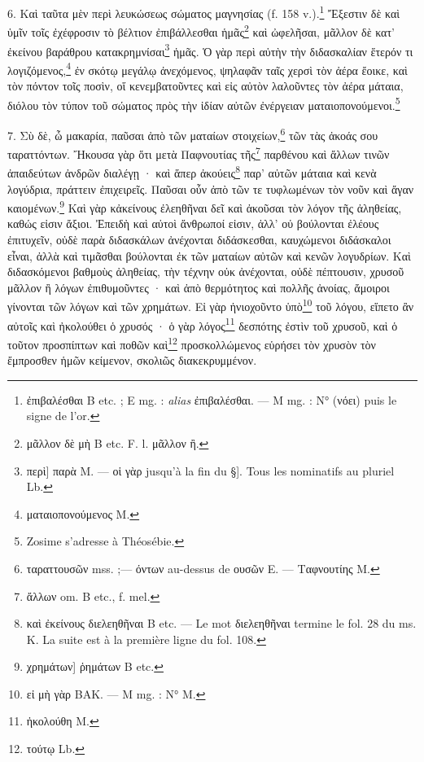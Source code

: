 \documentclass[landscape, a4paper, 11pt, oneside, polutonikogreek, french]{article}
\begin{document}
6. Καὶ ταῦτα μὲν περὶ λευκώσεως σώματος μαγνησίας (f. 158 v.).\footnote{ἐπιβαλέσθαι B etc. ; E mg. : \emph{alias} ἐπιβαλέσθαι. --- M mg. : N° (νόει) puis le signe de l'or.} Ἔξεστιν δὲ καὶ ὑμῖν τοῖς ἐχέφροσιν τὸ βέλτιον ἐπιβάλλεσθαι ἡμᾶς\footnote{μᾶλλον δὲ μὴ B etc. F. l. μᾶλλον ἢ.} καὶ ὠφελῆσαι, μᾶλλον δὲ κατ' ἐκείνου βαράθρου κατακρημνίσαι\footnote{περὶ] παρὰ M. --- οἱ γὰρ jusqu'à la fin du §]. Tous les nominatifs au pluriel Lb.} ἡμᾶς. Ὁ γὰρ περὶ αὐτὴν τὴν διδασκαλίαν ἕτερόν τι λογιζόμενος,\footnote{ματαιοπονούμενος M.} ἐν σκότῳ μεγάλῳ ἀνεχόμενος, ψηλαφᾶν ταῖς χερσὶ τὸν ἀέρα ἔοικε, καὶ τὸν πόντον τοῖς ποσὶν, οἵ κενεμβατοῦντες καὶ εἰς αὐτὸν λαλοῦντες τὸν ἀέρα μάταια, διόλου τὸν τύπον τοῦ σώματος πρὸς τὴν ἰδίαν αὐτῶν ἐνέργειαν ματαιοπονούμενοι.\footnote{Zosime s'adresse à Théosébie.}

7. Σὺ δὲ, ὦ μακαρία, παῦσαι ἀπὸ τῶν ματαίων στοιχείων,\footnote{ταραττουσῶν mss. ;--- όντων au-dessus de ουσῶν E. --- Ταφνουτίης M.} τῶν τὰς ἀκοάς σου ταραττόντων. Ἤκουσα γὰρ ὅτι μετὰ Παφνουτίας τῆς\footnote{ἄλλων om. B etc., f. mel.} παρθένου καὶ ἄλλων τινῶν ἀπαιδεύτων ἀνδρῶν διαλέγῃ · καὶ ἅπερ ἀκούεις\footnote{καὶ ἐκείνους διελεηθῆναι B etc. --- Le mot διελεηθῆναι termine le fol. 28 du ms. K. La suite est à la première ligne du fol. 108.} παρ' αὐτῶν μάταια καὶ κενὰ λογύδρια, πράττειν ἐπιχειρεῖς. Παῦσαι οὖν ἀπὸ τῶν τε τυφλωμένων τὸν νοῦν καὶ ἄγαν καιομένων.\footnote{χρημάτων] ῥημάτων B etc.} Καὶ γὰρ κἀκείνους ἐλεηθῆναι δεῖ καὶ ἀκοῦσαι τὸν λόγον τῆς ἀληθείας, καθώς εἰσιν ἄξιοι. Ἐπειδὴ καὶ αὐτοὶ ἄνθρωποί εἰσιν, ἀλλ' οὐ βούλονται ἐλέους ἐπιτυχεῖν, οὐδὲ παρὰ διδασκάλων ἀνέχονται διδάσκεσθαι, καυχώμενοι διδάσκαλοι εἶναι, ἀλλὰ καὶ τιμᾶσθαι βούλονται ἐκ τῶν ματαίων αὐτῶν καὶ κενῶν λογυδρίων. Καὶ διδασκόμενοι βαθμοὺς ἀληθείας, τὴν τέχνην οὐκ ἀνέχονται, οὐδὲ πέπτουσιν, χρυσοῦ μᾶλλον ἢ λόγων ἐπιθυμοῦντες · καὶ ἀπὸ θερμότητος καὶ πολλῆς ἀνοίας, ἄμοιροι γίνονται τῶν λόγων καὶ τῶν χρημάτων. Εἰ γὰρ ἠνιοχοῦντο ὑπὸ\footnote{εἰ μὴ γὰρ BAK. --- M mg. : N° M.} τοῦ λόγου, εἵπετο ἂν αὐτοῖς καὶ ἠκολούθει ὁ χρυσός · ὁ γὰρ λόγος\footnote{ἠκολούθη M.} δεσπότης ἐστὶν τοῦ χρυσοῦ, καὶ ὁ τοῦτον προσπίπτων καὶ ποθῶν καὶ\footnote{τούτῳ Lb.} προσκολλώμενος εὑρήσει τὸν χρυσὸν τὸν ἔμπροσθεν ἡμῶν κείμενον, σκολιῶς διακεκρυμμένον.
\end{document}
